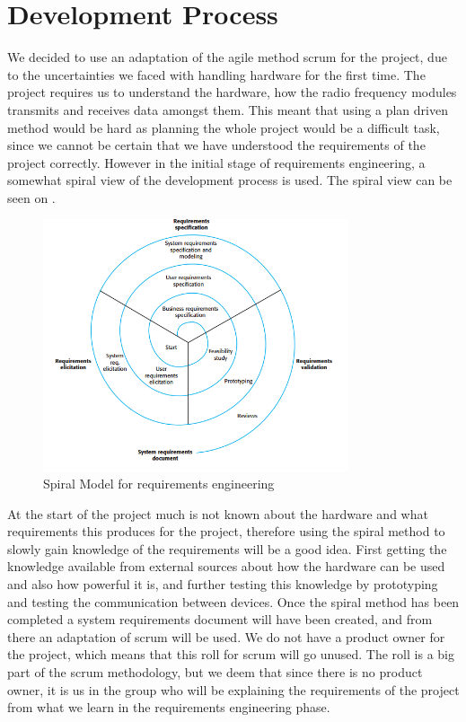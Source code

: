 \chapter{Development Process}
We decided to use an adaptation of the agile method scrum for the project, due to the uncertainties we faced with handling hardware for the first time. The project requires us to understand the hardware, how the radio frequency modules transmits and receives data amongst them. This meant that using a plan driven method would be hard as planning the whole project would be a difficult task, since we cannot be certain that we have understood the requirements of the project correctly.
However in the initial stage of requirements engineering, a somewhat spiral view of the development process is used. The spiral view can be seen on .

\begin{figure}[ht]
\centering
\includegraphics[width=0.80\textwidth]{Figures/spiral.png}
\caption{Spiral Model for requirements engineering \citep[p.112]{SOEBOOK}}\label{fig:spiralDiagram}
\end{figure}

At the start of the project much is not known about the hardware and what requirements this produces for the project, therefore using the spiral method to slowly gain knowledge of the requirements will be a good idea. First getting the knowledge available from external sources about how the hardware can be used and also how powerful it is, and further testing this knowledge by prototyping and testing the communication between devices. 
Once the spiral method has been completed a system requirements document will have been created, and from there an adaptation of scrum will be used.
We do not have a product owner for the project, which means that this roll for scrum will go unused. The roll is a big part of the scrum methodology, but we deem that since there is no product owner, it is us in the group who will be explaining the requirements of the project from what we learn in the requirements engineering phase. 


